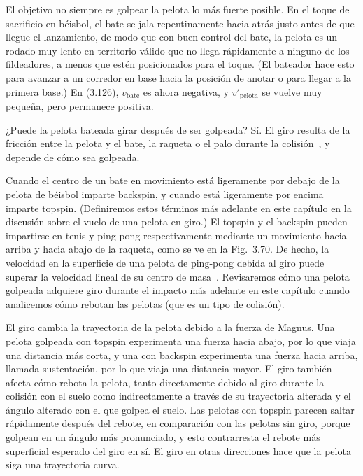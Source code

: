 \documentclass[12pt]{book}
\begin{document}
El objetivo no siempre es golpear la pelota lo más fuerte posible. En el toque de sacrificio en béisbol, el bate se jala repentinamente hacia atrás justo antes de que llegue el lanzamiento, de modo que con buen control del bate, la pelota es un rodado muy lento en territorio válido que no llega rápidamente a ninguno de los fildeadores, a menos que estén posicionados para el toque. (El bateador hace esto para avanzar a un corredor en base hacia la posición de anotar o para llegar a la primera base.) En (3.126), $v_{\text{bate}}$ es ahora negativa, y $v'_{\text{pelota}}$ se vuelve muy pequeña, pero permanece positiva.

¿Puede la pelota bateada girar después de ser golpeada? Sí. El giro resulta de la fricción entre la pelota y el bate, la raqueta o el palo durante la colisión~\cite{ref36,ref60}, y depende de cómo sea golpeada.

Cuando el centro de un bate en movimiento está ligeramente por debajo de la pelota de béisbol imparte backspin, y cuando está ligeramente por encima imparte topspin. (Definiremos estos términos más adelante en este capítulo en la discusión sobre el vuelo de una pelota en giro.) El topspin y el backspin pueden impartirse en tenis y ping-pong respectivamente mediante un movimiento hacia arriba y hacia abajo de la raqueta, como se ve en la Fig.~3.70. De hecho, la velocidad en la superficie de una pelota de ping-pong debida al giro puede superar la velocidad lineal de su centro de masa~\cite{ref16}. Revisaremos cómo una pelota golpeada adquiere giro durante el impacto más adelante en este capítulo cuando analicemos cómo rebotan las pelotas (que es un tipo de colisión).

El giro cambia la trayectoria de la pelota debido a la fuerza de Magnus. Una pelota golpeada con topspin experimenta una fuerza hacia abajo, por lo que viaja una distancia más corta, y una con backspin experimenta una fuerza hacia arriba, llamada sustentación, por lo que viaja una distancia mayor. El giro también afecta cómo rebota la pelota, tanto directamente debido al giro durante la colisión con el suelo como indirectamente a través de su trayectoria alterada y el ángulo alterado con el que golpea el suelo. Las pelotas con topspin parecen saltar rápidamente después del rebote, en comparación con las pelotas sin giro, porque golpean en un ángulo más pronunciado, y esto contrarresta el rebote más superficial esperado del giro en sí. El giro en otras direcciones hace que la pelota siga una trayectoria curva.
\end{document}
